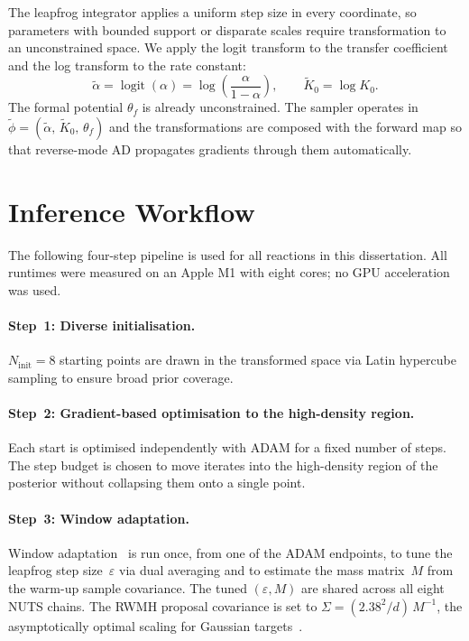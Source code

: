 The leapfrog integrator applies a uniform step size in every coordinate,
so parameters with bounded support or disparate scales require
transformation to an unconstrained space. We apply the logit transform to
the transfer coefficient and the log transform to the rate constant:
\begin{equation}
  \tilde{\alpha} = \operatorname{logit}(\alpha)
  = \log\!\left(\frac{\alpha}{1 - \alpha}\right), \qquad
  \tilde{K}_0 = \log K_0.
  \label{eq:transforms}
\end{equation}
The formal potential $\theta_f$ is already unconstrained. The sampler
operates in $\tilde{\phi} = (\tilde{\alpha},\, \tilde{K}_0,\, \theta_f)$
and the transformations are composed with the forward map so that
reverse-mode AD propagates gradients through them automatically.

\section{Inference Workflow}\label{sec:workflow}

The following four-step pipeline is used for all reactions in this
dissertation. All runtimes were measured on an Apple M1 with eight
cores; no GPU acceleration was used.

\paragraph{Step~1: Diverse initialisation.}
$N_{\mathrm{init}} = 8$ starting points are drawn in the transformed
space via Latin hypercube sampling to ensure broad prior coverage.

\paragraph{Step~2: Gradient-based optimisation to the high-density
region.} Each start is optimised independently with ADAM for a fixed
number of steps. The step budget is chosen to move iterates into the
high-density region of the posterior without collapsing them onto a
single point.

\paragraph{Step~3: Window adaptation.}
Window adaptation~\cite{stan2024reference,cabezas2024blackjax} is run
once, from one of the ADAM endpoints, to tune the leapfrog step
size~$\varepsilon$ via dual averaging and to estimate the mass
matrix~$M$ from the warm-up sample covariance. The tuned
$(\varepsilon,M)$ are shared across all eight NUTS chains. The RWMH
proposal covariance is set to $\Sigma = (2.38^{2}/d)\, M^{-1}$, the
asymptotically optimal scaling for Gaussian targets~\cite{gelman1997weak}.


